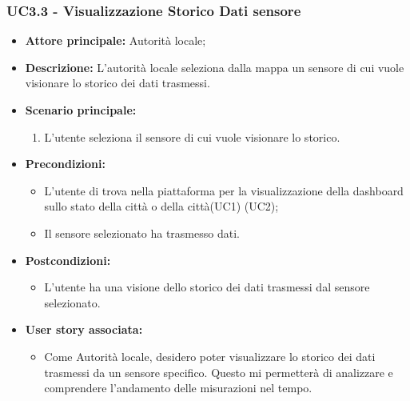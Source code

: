 \subsubsection{UC3.3 - Visualizzazione Storico Dati sensore}
\begin{itemize}
    \item \textbf{Attore principale:} Autorità locale;
    \item \textbf{Descrizione:} L’autorità locale seleziona dalla mappa un sensore di cui vuole visionare lo storico dei dati trasmessi.
    \item \textbf{Scenario principale:}
          \begin{enumerate}
              \item L'utente seleziona il sensore di cui vuole visionare lo storico.
          \end{enumerate}
    \item \textbf{Precondizioni:}
          \begin{itemize}
              \item  L'utente di trova  nella piattaforma per la visualizzazione della dashboard sullo stato della città o della città(UC1) (UC2);
              \item Il sensore selezionato ha trasmesso dati.
          \end{itemize}
    \item \textbf{Postcondizioni:}
          \begin{itemize}
              \item  L'utente ha una visione dello storico dei dati trasmessi dal sensore selezionato.
          \end{itemize}
    \item \textbf{User story associata:}
          \begin{itemize}
              \item Come Autorità locale, desidero poter visualizzare lo storico dei dati trasmessi da un sensore specifico. Questo mi permetterà di analizzare e comprendere l'andamento delle misurazioni nel tempo.
          \end{itemize}
\end{itemize}